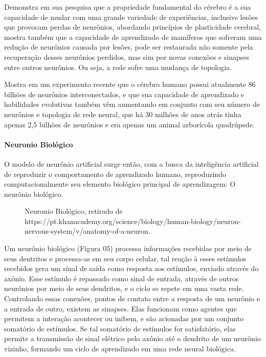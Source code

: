 \documentclass[	12pt, Times, openright, twoside, a4paper, english, brazil]{abntex2}
\begin{document}
            \cite{Muhammad2014} Demonstra em sua pesquisa que a propriedade fundamental do cérebro é a sua capacidade de mudar com uma grande variedade de experiências, inclusive lesões que provocam perdas de neurônios, abordando princípios de plasticidade cerebral, mostra também que a capacidade de aprendizado de mamíferos que sofreram uma redução de neurônios causada por lesões, pode ser restaurada não somente pela recuperação desses neurônios perdidos, mas sim por novas conexões e sinapses entre outros neurônios. Ou seja, a rede sofre uma mudança de topologia.

            \cite{Fapesp192} Mostra em um experimento recente que o cérebro humano possui atualmente 86 bilhões de neurônios interconectados, e que sua capacidade de aprendizado e habilidades evolutivas também vêm aumentando em conjunto com seu número de neurônios e topologia de rede neural, que há 30 milhões de anos atrás tinha apenas 2,5 bilhões de neurônios e era apenas um animal arborícola quadrúpede.
          \paragraph*{Neuronio Biológico}
            O modelo de neurônio artificial surge então, com a busca da inteligência artificial de reproduzir o comportamento de aprendizado humano, reproduzindo computacionalmente seu elemento biológico principal de aprendizagem: O neurônio biológico. 
            \begin{figure}[!ht]
              \caption{Neuronio Biológico, retirado de https://pt.khanacademy.org/science/biology/human-biology/neuron-nervous-system/v/anatomy-of-a-neuron.\label{fig:NeuronioBiológico}}
            \end{figure}
            Um neurônio biológico (Figura 05) processa informações recebidas por meio de seus dentritos e processa-as em seu corpo celular, tal reação à esses estímulos recebidos gera um sínal de saída como resposta aos estímulos, enviado através do axônio. Esse estímulo é repassado como sinal de entrada, através de outros neurônios por meio de seus dendritos, e o ciclo se repete em uma vasta rede.
            Controlando essas conexões, pontos de contato entre a resposta de um neurônio e a entrada de outro, existem as sinapses. Elas funcionam como agentes que permitem a interação acontecer ou inibem, e são acionadas por um conjunto somatório de estímulos. Se tal somatório de estímulos for satisfatório, elas permite a transmissão de sinal elétrico pelo axônio até o dendrito de um neurônio vizinho, formando um ciclo de aprendizado em uma rede neural biológica.
\end{document}
